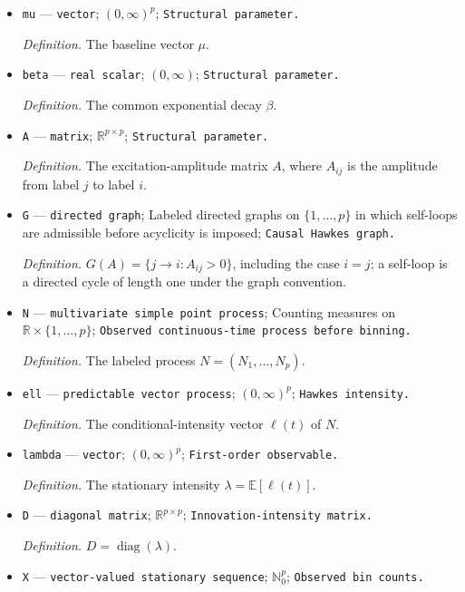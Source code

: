 \documentclass{article}
\begin{document}
\begin{itemize}
  \item \texttt{mu} --- \texttt{vector}; \((0,\infty)^p\); \texttt{Structural parameter.}
  \par\smallskip\noindent\emph{Definition.} The baseline vector \(\mu\).
  \item \texttt{beta} --- \texttt{real scalar}; \((0,\infty)\); \texttt{Structural parameter.}
  \par\smallskip\noindent\emph{Definition.} The common exponential decay \(\beta\).
  \item \texttt{A} --- \texttt{matrix}; \(\mathbb R^{p\times p}\); \texttt{Structural parameter.}
  \par\smallskip\noindent\emph{Definition.} The excitation-amplitude matrix \(A\), where \(A_{ij}\) is the amplitude from label \(j\) to label \(i\).
  \item \texttt{G} --- \texttt{directed graph}; Labeled directed graphs on \(\{1,\ldots,p\}\) in which self-loops are admissible before acyclicity is imposed; \texttt{Causal Hawkes graph.}
  \par\smallskip\noindent\emph{Definition.} \(G(A)=\{j\to i:A_{ij}>0\}\), including the case \(i=j\); a self-loop is a directed cycle of length one under the graph convention.
  \item \texttt{N} --- \texttt{multivariate simple point process}; Counting measures on \(\mathbb R\times\{1,\ldots,p\}\); \texttt{Observed continuous-\allowbreak{}time process before binning.}
  \par\smallskip\noindent\emph{Definition.} The labeled process \(N=(N_1,\ldots,N_p)\).
  \item \texttt{ell} --- \texttt{predictable vector process}; \((0,\infty)^p\); \texttt{Hawkes intensity.}
  \par\smallskip\noindent\emph{Definition.} The conditional-intensity vector \(\ell(t)\) of \(N\).
  \item \texttt{lambda} --- \texttt{vector}; \((0,\infty)^p\); \texttt{First-\allowbreak{}order observable.}
  \par\smallskip\noindent\emph{Definition.} The stationary intensity \(\lambda=\mathbb E[\ell(t)]\).
  \item \texttt{D} --- \texttt{diagonal matrix}; \(\mathbb R^{p\times p}\); \texttt{Innovation-\allowbreak{}intensity matrix.}
  \par\smallskip\noindent\emph{Definition.} \(D=\operatorname{diag}(\lambda)\).
  \item \texttt{X} --- \texttt{vector-\allowbreak{}valued stationary sequence}; \(\mathbb N_0^p\); \texttt{Observed bin counts.}

\end{itemize}
\end{document}
